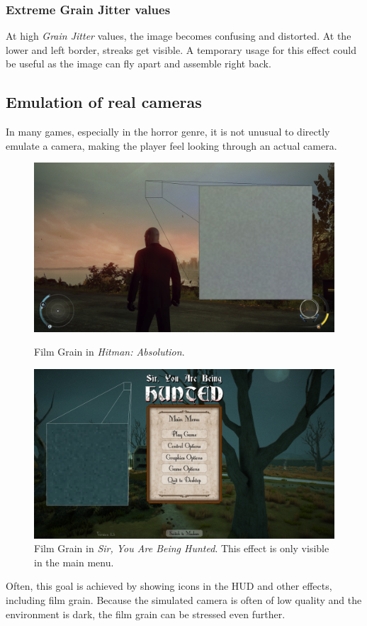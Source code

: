 \documentclass[A4]{article}
\begin{document}
	\subsubsection{Extreme Grain Jitter values}
	At high \textit{Grain Jitter} values, the image becomes confusing and distorted. At the lower and left border, streaks get visible. A temporary usage for this effect could be useful as the image can fly apart and assemble right back.
	
	\clearpage
	
	\subsection{Emulation of real cameras}
	In many games, especially in the horror genre, it is not unusual to directly emulate a camera, making the player feel looking through an actual camera.
	\begin{figure}
		\begin{center}
			\vspace{-20px}
			\includegraphics[scale=0.12]{Hitman.png}
			\vspace{-20px}
		\end{center}
		\caption{Film Grain in \textit{Hitman: Absolution}.}
		\begin{center}
			\includegraphics[scale=0.12]{SirYouAreBeingHunted.png}
			\vspace{-20px}
		\end{center}
		\caption{Film Grain in \textit{Sir, You Are Being Hunted}. This effect is only visible in the main menu.}
	\end{figure}
	Often, this goal is achieved by showing icons in the HUD and other effects, including film grain. Because the simulated camera is often of low quality and the environment is dark, the film grain can be stressed even further.
	
\end{document}
